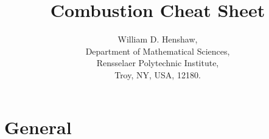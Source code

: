 \documentclass[10pt]{article}
\begin{document}
 
\title{Combustion Cheat Sheet}

\author{
William D. Henshaw,\\
Department of Mathematical Sciences, \\
Rensselaer Polytechnic Institute, \\
Troy, NY, USA, 12180.
}
 
\maketitle


\newcommand{\mbar}{\bar{m}}
\newcommand{\Rbar}{\bar{R}}
\newcommand{\Ru}{R_u}         %
\newcommand{\Div}{\grad\cdot}
\newcommand{\tauv}{\boldsymbol{\tau}}
\newcommand{\sigmav}{\boldsymbol{\sigma}}
\newcommand{\sumi}{\sum_{i=1}^n}

\tableofcontents

\section{General}
\end{document}
